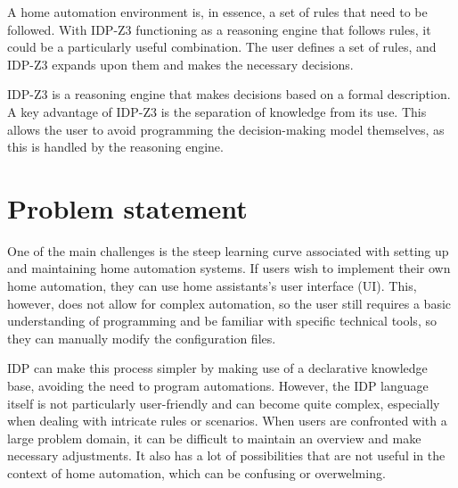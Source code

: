 \documentclass[11pt,a4paper]{report}
\begin{document}
A home automation environment is, in essence, a set of rules that need to be followed. With IDP-Z3 functioning as a reasoning engine that follows rules, it could be a particularly useful combination. The user defines a set of rules, and IDP-Z3 expands upon them and makes the necessary decisions.

IDP-Z3 is a reasoning engine that makes decisions based on a formal description. A key advantage of IDP-Z3 is the separation of knowledge from its use. This allows the user to avoid programming the decision-making model themselves, as this is handled by the reasoning engine.

\section{Problem statement}
One of the main challenges is the steep learning curve associated with setting up and maintaining home automation systems. If users wish to implement their own home automation, they can use home assistants's user interface (UI). This, however, does not allow for complex automation, so the user still requires a basic understanding of programming and be familiar with specific technical tools, so they can manually modify the configuration files. 

IDP can make this process simpler by making use of a declarative knowledge base, avoiding the need to program automations. However, the IDP language itself is not particularly user-friendly and can become quite complex, especially when dealing with intricate rules or scenarios. When users are confronted with a large problem domain, it can be difficult to maintain an overview and make necessary adjustments. It also has a lot of possibilities that are not useful in the context of home automation, which can be confusing or overwelming.
\end{document}
